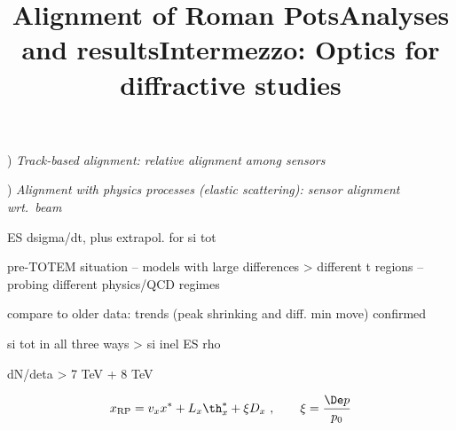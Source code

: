 
\newpage %
\title{Alignment of Roman Pots}


) \em{\cYe Track-based alignment\cFg}: relative alignment among sensors


\vfil
{}) \em{\cYe Alignment with physics processes (elastic scattering)\cFg}: sensor alignment wrt.~beam


\vfil

\newpage %
\hbox{}
\vfil
\title{Analyses and results}

\newpage %
\title{}

\> ES dsigma/dt, plus extrapol. for si tot

\> pre-TOTEM situation -- models with large differences
\>> different t regions -- probing different physics/QCD regimes

\> compare to older data: trends (peak shrinking and diff. min move) confirmed

\newpage %
\title{}

\> si tot in all three ways
\>> si inel
\> ES rho

\newpage %
\title{}

\> dN/deta
\>> 7 TeV + 8 TeV

\newpage %
\title{Intermezzo: Optics for diffractive studies}
\vskip-8mm
$$x_{\rm RP} = v_x x^* + L_x \th_x^* + \xi D_x\ ,\qquad \xi = {\De p\over p_0}$$
\vskip-2mm

